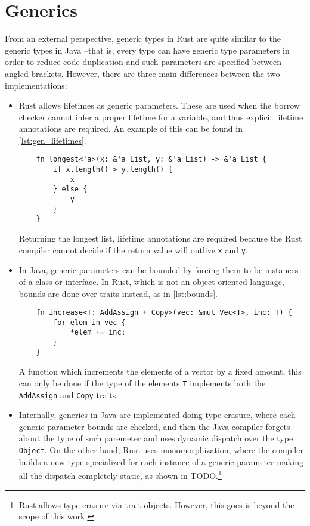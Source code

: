 \section{Generics}
From an external perspective, generic types in Rust are quite similar to the generic types in Java --that is, every type can have generic type parameters in order to reduce code duplication and such parameters are specified between angled brackets. However, there are three main differences between the two implementations:

\begin{itemize}
    \item Rust allows lifetimes as generic parameters. These are used when the
        borrow checker cannot infer a proper lifetime for a variable, and thus
        explicit lifetime annotations are required. An example of this can be
        found in \ref{lst:gen_lifetimes}.
  
\begin{listing}[ht]
	\begin{verbatim}
    fn longest<'a>(x: &'a List, y: &'a List) -> &'a List {
        if x.length() > y.length() {
            x
        } else {
            y
        }
    }
    \end{verbatim}
    \caption{Returning the longest list, lifetime annotations are required
    because the Rust compiler cannot decide if the return value will outlive
\texttt{x} and \texttt{y}.}
  \label{lst:gen_lifetimes}
\end{listing}
    
    \item In Java, generic parameters can be bounded by forcing them to be
        instances of a class or interface. In Rust, which is not an object
        oriented language, bounds are done over traits instead, as in
        \ref{lst:bounds}.


  
\begin{listing}[ht]
	\begin{verbatim}
    fn increase<T: AddAssign + Copy>(vec: &mut Vec<T>, inc: T) {
        for elem in vec {
            *elem += inc;
        }
    }
    \end{verbatim}
    \caption{A function which increments the elements of a vector by a fixed
        amount, this can only be done if the type of the elements \texttt{T}
        implements both the \texttt{AddAssign} and \texttt{Copy} traits.}
  \label{lst:bounds}
\end{listing}
    \item Internally, generics in Java are implemented doing type erasure, where each generic parameter bounds are checked, and then the Java compiler forgets about the type of such paremeter and uses dynamic dispatch over the type \texttt{Object}. On the other hand, Rust uses monomorphization, where the compiler builds a new type specialized for each instance of a generic parameter making all the dispatch completely static, as shown in TODO.\footnote{Rust allows type erasure via trait objects. However, this goes is beyond the scope of this work.}
\end{itemize}

